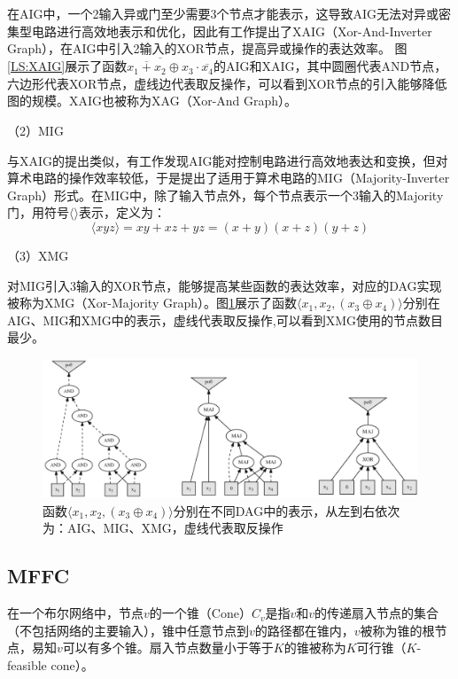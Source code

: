 在AIG中，一个2输入异或门至少需要3个节点才能表示，这导致AIG无法对异或密集型电路进行高效地表示和优化，因此有工作提出了XAIG（Xor-And-Inverter Graph），在AIG中引入2输入的XOR节点，提高异或操作的表达效率\cite{LS:XAIG_Microelec_Relia,LS:XAIG_ddecs,LS:XAIG_iwls}。
图\ref{LS:XAIG}展示了函数$ \overline{ \overline{x_1 + x_2} \oplus x_3} \cdot \overline{x_4} $的AIG和XAIG，其中圆圈代表AND节点，六边形代表XOR节点，虚线边代表取反操作，可以看到XOR节点的引入能够降低图的规模。XAIG也被称为XAG（Xor-And Graph）。

（2）MIG

与XAIG的提出类似，有工作发现AIG能对控制电路进行高效地表达和变换，但对算术电路的操作效率较低，于是提出了适用于算术电路的MIG（Majority-Inverter Graph）\cite{LS:MIG}形式。在MIG中，除了输入节点外，每个节点表示一个3输入的Majority门，用符号$\langle \rangle$表示，定义为：
\begin{equation}
    \label{LS:MIG:Eq:Majority}
    \langle xyz \rangle = xy + xz + yz = (x + y) (x + z) (y + z)
\end{equation}

（3）XMG

对MIG引入3输入的XOR节点，能够提高某些函数的表达效率，对应的DAG实现被称为XMG（Xor-Majority Graph）\cite{LS:XMG_2017}。图\ref{LS:XMG}展示了函数$\langle x_1,x_2,(x_3 \oplus x_4) \rangle$分别在AIG、MIG和XMG中的表示，虚线代表取反操作,可以看到XMG使用的节点数目最少\cite{LS:XMG_2024}。

\begin{figure}[!htbp]
    \centering
    \includegraphics[width=\linewidth]{./figs/LS-XMG.png}
    \caption{函数$\langle x_1,x_2,(x_3 \oplus x_4) \rangle$分别在不同DAG中的表示，从左到右依次为：AIG、MIG、XMG，虚线代表取反操作}
    \label{LS:XMG}
\end{figure}

\subsection{MFFC} \label{MFFC}

在一个布尔网络中，节点$v$的一个锥（Cone）$C_v$是指$v$和$v$的传递扇入节点的集合（不包括网络的主要输入），锥中任意节点到$v$的路径都在锥内，$v$被称为锥的根节点，易知$v$可以有多个锥\cite{LS:exact_rewriting,FPGA:Jason_Cong_1993}。扇入节点数量小于等于$K$的锥被称为$K$可行锥（$K$-feasible cone）\cite{FPGA:Jason_Cong_1999_cut_ranking}。

